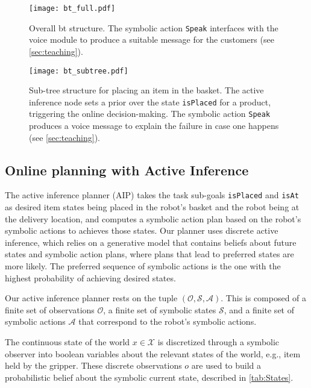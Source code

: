 \begin{figure}[b!]
    \centering
    \texttt{[image: bt\_full.pdf]}
    \caption{Overall \ac{bt} structure. The symbolic action
    \texttt{Speak{}} interfaces with the voice module to
    produce a suitable message for the customers (see
    \cref{sec:teaching}).}
    \label{fig:bt_full}
\end{figure}



\begin{figure}[b!]
    \centering
    \texttt{[image: bt\_subtree.pdf]}
    \caption{Sub-tree structure for placing an item in the
    basket. The active inference node sets a prior over the
    state \texttt{isPlaced{}} for a product, triggering the
    online decision-making. The symbolic action \texttt{Speak{}}
    produces a voice message to explain the failure in case
    one happens (see \cref{sec:teaching}).}
    \label{fig:subtree}
\end{figure}




\subsection{Online planning with Active Inference} 

The active inference planner (AIP) takes the task sub-goals
\texttt{isPlaced} and \texttt{isAt} as desired item states
being placed in the robot's basket and the robot being at
the delivery location, and computes a symbolic action plan
based on the robot's symbolic actions to achieves those states.
Our planner uses discrete active inference, which relies on
a generative model that contains beliefs about future states
and symbolic action plans, where plans that lead to preferred
states are more likely. The preferred sequence of symbolic
actions is the
one with the highest probability of achieving desired
states. 

Our active inference planner rests on the tuple
$(\mathcal{O},\mathcal{S},\mathcal{A})$. This is composed of
a finite set of observations $\mathcal{O}$, a finite set of
symbolic states $\mathcal{S}$, and a finite set of symbolic
actions $\mathcal{A}$ that correspond to the robot's
symbolic actions.


The continuous state of the world $x\in\mathcal{X}$ is
discretized through a symbolic observer into boolean
variables about the relevant states of the world, e.g., item
held by the gripper. These discrete observations $o$ are
used to build a probabilistic belief about the symbolic
current state, described in \cref{tab:States}.



